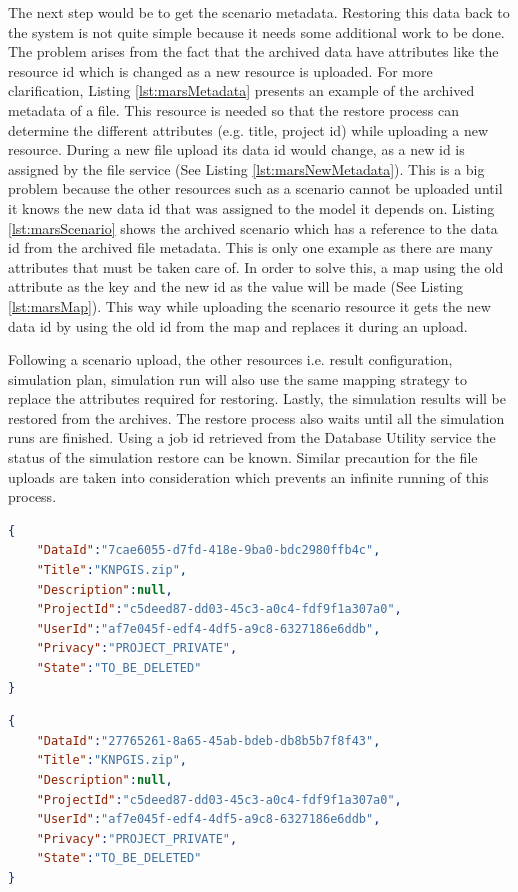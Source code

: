 The next step would be to get the scenario metadata. Restoring this data back to the system is not quite simple because it needs some additional 
work to be done. 
The problem arises from the fact that the archived data have attributes like the resource id which is changed as a new resource is uploaded. For more clarification, 
Listing \ref{lst:marsMetadata} presents an example of the archived metadata of a file. This resource is needed so that the restore process can determine the different 
attributes (e.g. title, project id) while uploading a new resource. During a new file upload 
its data id  would change, as a new id is assigned by the file service (See Listing \ref{lst:marsNewMetadata}). 
This is a big problem because the other resources such as a scenario cannot be uploaded until it knows the new data id that was assigned to the model it 
depends on. Listing \ref{lst:marsScenario} shows the archived scenario which has a reference to the data id from the archived file metadata. 
This is only one example as there are many attributes that must be taken care of. In order to solve this, a map using the old attribute as the key and the 
new id as the value will be made (See Listing \ref{lst:marsMap}).
This way while uploading the scenario resource it gets the new data id by using the old id from the map and replaces it during an upload. 

Following a scenario upload, the other resources i.e. result configuration, simulation plan, simulation run will also use the same mapping strategy to replace 
the attributes required for restoring. 
Lastly, the simulation results will be restored from the archives. The restore process also waits until all the simulation runs are finished. Using a job id retrieved from the Database 
Utility service the status of the simulation restore can be known. Similar precaution for the file uploads are taken into consideration which prevents an infinite running
of this process.


\newpage
\begin{lstlisting}[caption={Snippet of archived MARS metadata resource}, language=json,firstnumber=1, captionpos=b, label={lst:marsMetadata}]
{
    "DataId":"7cae6055-d7fd-418e-9ba0-bdc2980ffb4c",
    "Title":"KNPGIS.zip",
    "Description":null,
    "ProjectId":"c5deed87-dd03-45c3-a0c4-fdf9f1a307a0",
    "UserId":"af7e045f-edf4-4df5-a9c8-6327186e6ddb",
    "Privacy":"PROJECT_PRIVATE",
    "State":"TO_BE_DELETED"
}
\end{lstlisting}

\begin{lstlisting}[caption={Snippet of the uploaded MARS metadata resource}, language=json,firstnumber=1, captionpos=b, label={lst:marsNewMetadata}]
{
    "DataId":"27765261-8a65-45ab-bdeb-db8b5b7f8f43",
    "Title":"KNPGIS.zip",
    "Description":null,
    "ProjectId":"c5deed87-dd03-45c3-a0c4-fdf9f1a307a0",
    "UserId":"af7e045f-edf4-4df5-a9c8-6327186e6ddb",
    "Privacy":"PROJECT_PRIVATE",
    "State":"TO_BE_DELETED"
}
\end{lstlisting}

